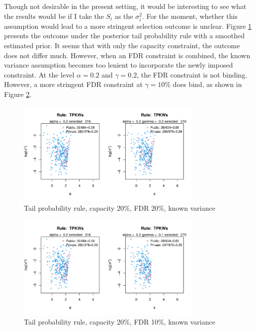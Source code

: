 \documentclass[12pt]{article}
\begin{document}
Though not desirable in the present setting, it would be interesting to see
what the results would be if I take the $S_i$ as the $\sigma_i^2$. For the
moment, whether this assumption would lead to a more stringent selection
outcome is unclear. Figure \ref{fig:tp_0.2_0.2_1d} presents the outcome under
the posterior tail probability rule with a smoothed estimated prior. It seems
that with only the capacity constraint, the outcome does not differ much.
However, when an FDR constraint is combined, the known variance assumption
becomes too lenient to incorporate the newly imposed constraint. At the level
$\alpha=0.2$ and $\gamma=0.2$, the FDR constraint is not binding. However, a
more stringent FDR constraint at $\gamma=10\%$ does bind, as shown in Figure
\ref{fig:tp_0.2_0.1_1d}.

\begin{figure}[h!]
    \centering
    \includegraphics[width=0.8\textwidth]{../../Figures/2013-2022/GMM_fd/GLmix/Left_0.2_0.2_TPKWs.pdf}
    \caption{Tail probability rule, capacity 20\%, FDR 20\%, known variance}
    \label{fig:tp_0.2_0.2_1d}
\end{figure}

\begin{figure}[h!]
    \centering
    \includegraphics[width=0.8\textwidth]{../../Figures/2013-2022/GMM_fd/GLmix/Left_0.2_0.1_TPKWs.pdf}
    \caption{Tail probability rule, capacity 20\%, FDR 10\%, known variance}
    \label{fig:tp_0.2_0.1_1d}
\end{figure}
\end{document}
